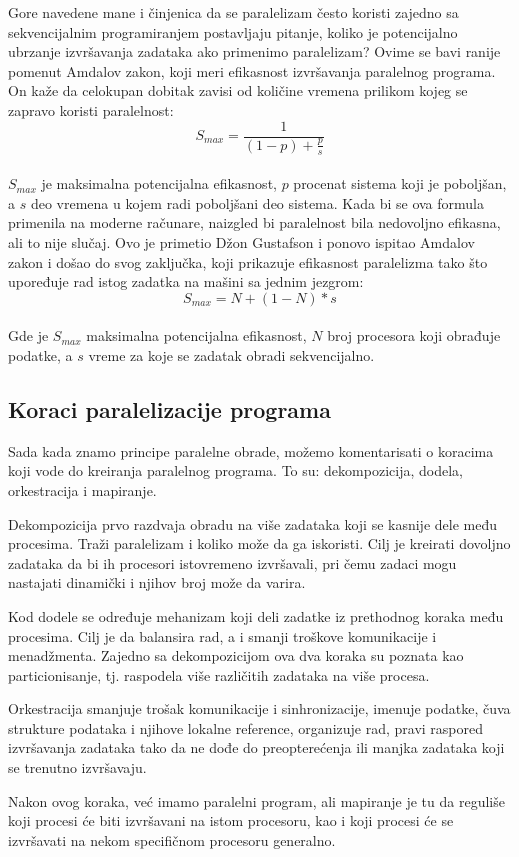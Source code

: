 \documentclass[a4paper]{article}
\begin{document}
{Gore navedene mane i činjenica da se paralelizam često koristi zajedno sa sekvencijalnim programiranjem postavljaju pitanje, koliko je potencijalno ubrzanje izvršavanja zadataka ako primenimo paralelizam? Ovime se bavi ranije pomenut Amdalov zakon, koji meri efikasnost izvršavanja paralelnog programa. On kaže da celokupan dobitak zavisi od količine vremena prilikom kojeg se zapravo koristi paralelnost: \\
\begin{equation*}
S_{max} = \frac{1}{(1 - p) + \frac{p}{s}}
\end{equation*}\\
$S_{max}$ je maksimalna potencijalna efikasnost, $p$ procenat sistema koji je poboljšan, a $s$ deo vremena u kojem radi poboljšani deo sistema. Kada bi se ova formula primenila na moderne računare, naizgled bi paralelnost bila nedovoljno efikasna, ali to nije slučaj. Ovo je primetio Džon Gustafson i ponovo ispitao Amdalov zakon i došao do svog zaključka, koji prikazuje efikasnost paralelizma tako što upoređuje rad istog zadatka na mašini sa jednim jezgrom:\\
\begin{equation*}
S_{max} = N + (1 - N) * s
\end{equation*}\\
Gde je $S_{max}$ maksimalna potencijalna efikasnost, $N$ broj procesora koji obrađuje podatke, a $s$ vreme za koje se zadatak obradi sekvencijalno.
\subsection{Koraci paralelizacije programa}
Sada kada znamo principe paralelne obrade, možemo komentarisati o koracima koji vode do kreiranja paralelnog programa. To su: dekompozicija, dodela, orkestracija i mapiranje.\par
Dekompozicija prvo razdvaja obradu na više zadataka koji se kasnije dele među procesima. Traži paralelizam i koliko može da ga iskoristi. Cilj je kreirati dovoljno zadataka da bi ih procesori istovremeno izvršavali, pri čemu zadaci mogu nastajati dinamički i njihov broj može da varira.\par 
Kod dodele se određuje mehanizam koji deli zadatke iz prethodnog koraka među procesima. Cilj je da balansira rad, a i smanji troškove komunikacije i menadžmenta. Zajedno sa dekompozicijom ova dva koraka su poznata kao particionisanje, tj. raspodela više različitih zadataka na više procesa. \par 
Orkestracija smanjuje trošak komunikacije i sinhronizacije, imenuje podatke, čuva strukture podataka i njihove lokalne reference, organizuje rad, pravi raspored izvršavanja zadataka tako da ne dođe do preopterećenja ili manjka zadataka koji se trenutno izvršavaju. \par 
Nakon ovog koraka, već imamo paralelni program, ali mapiranje je tu da reguliše koji procesi će biti izvršavani na istom procesoru, kao i koji procesi će se izvršavati na nekom specifičnom procesoru generalno. 
}
\end{document}

